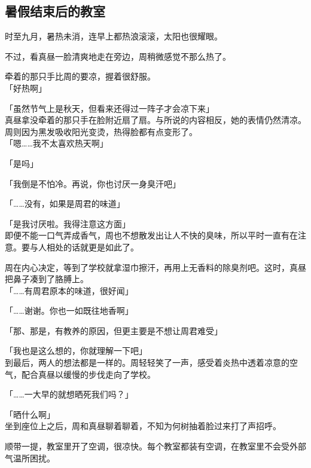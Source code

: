 \subsection{暑假结束后的教室}

时至九月，暑热未消，连早上都热浪滚滚，太阳也很耀眼。

不过，看真昼一脸清爽地走在旁边，周稍微感觉不那么热了。

牵着的那只手比周的要凉，握着很舒服。\\

「好热啊」

「虽然节气上是秋天，但看来还得过一阵子才会凉下来」\\

真昼拿没牵着的那只手在脸附近扇了扇。与所说的内容相反，她的表情仍然清凉。周则因为黑发吸收阳光变烫，热得脸都有点变形了。\\

「嗯……我不太喜欢热天啊」

「是吗」

「我倒是不怕冷。再说，你也讨厌一身臭汗吧」

「……没有，如果是周君的味道」

「是我讨厌啦。我得注意这方面」\\

即便不能一口气弄成香气，周也不想散发出让人不快的臭味，所以平时一直有在注意。要与人相处的话就更是如此了。

周在内心决定，等到了学校就拿湿巾擦汗，再用上无香料的除臭剂吧。这时，真昼把鼻子凑到了胳膊上。\\

「……有周君原本的味道，很好闻」

「……谢谢。你也一如既往地香啊」

「那、那是，有教养的原因，但更主要是不想让周君难受」

「我也是这么想的，你就理解一下吧」\\

到最后，两人的想法都是一样的。周轻轻笑了一声，感受着炎热中透着凉意的空气，配合真昼以缓慢的步伐走向了学校。\\

\vspace{2\baselineskip}

「……一大早的就想晒死我们吗？」

「晒什么啊」\\

坐到座位上之后，周和真昼聊着聊着，不知为何树抽着脸过来打了声招呼。

顺带一提，教室里开了空调，很凉快。每个教室都装有空调，在教室里不会受外部气温所困扰。\\

